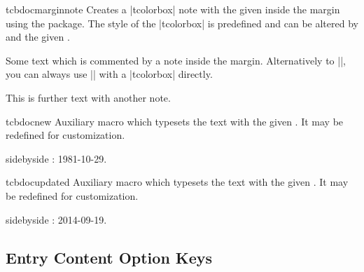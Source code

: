 \begin{docCommand}[doc new=2014-09-19]{tcbdocmarginnote}{}
  Creates a |tcolorbox| note with the given  inside the margin using
  the  package. The style of the |tcolorbox| is predefined and can be
  altered by  and the given .
\begin{dispExample}
Some text
which is commented by a note inside the margin.
Alternatively to |\tcbdocmarginnote|, you can always use
|\marginnote| with a |tcolorbox| directly.\par
This is further text%
with another note.
\end{dispExample}
\end{docCommand}

\begin{docCommand}[doc new=2014-09-19]{tcbdocnew}{}
  Auxiliary macro which typesets the  text with
  the given . It may be redefined for customization.
  \makeatletter\renewcommand*{\tcbdocnew}[1]{\kvtcb@text@new: #1}\makeatother%
\begin{dispExample*}{sidebyside}
\tcbdocnew{1981-10-29}.
\tcbdocmarginnote{\tcbdocnew{1978-02-09}}
\end{dispExample*}
\end{docCommand}

\begin{docCommand}[doc new=2014-09-19]{tcbdocupdated}{}
  Auxiliary macro which typesets the  text with
  the given . It may be redefined for customization.
  \makeatletter\renewcommand*{\tcbdocupdated}[1]{\kvtcb@text@updated: #1}\makeatother%
\begin{dispExample*}{sidebyside}
\tcbdocupdated{2014-09-19}.
\end{dispExample*}
\end{docCommand}


\clearpage
\subsection{Entry Content Option Keys}


